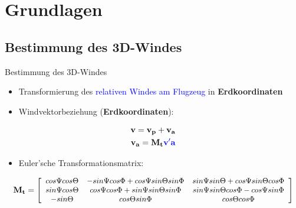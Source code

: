\documentclass[ucs,9pt]{beamer}
\begin{document}
\section{Grundlagen}

\subsection{Bestimmung des 3D-Windes}

\begin{frame}{Bestimmung des 3D-Windes}
	\begin{itemize}
		\item Transformierung des \textcolor{blue}{relativen Windes am Flugzeug} in \textbf{Erdkoordinaten}
		\item Windvektorbeziehung (\textbf{Erdkoordinaten}):
	\end{itemize}
	
	\begin{align}
		\mathbf{v} = \mathbf{v_p} + \mathbf{v_a} \\
		\mathbf{v_a} = \mathbf{M_t} \textcolor{blue}{\mathbf{v'a}} \\
	\end{align}
	\begin{itemize}
		\item Euler'sche Transformationsmatrix:
	\end{itemize}
	\begin{equation}\small
		\mathbf{M_t} = \left[\begin{array}{ccc}
		cos\Psi cos\Theta & -sin\Psi cos\Phi + cos\Psi sin\Theta sin\Phi & sin\Psi sin\Theta + cos\Psi sin\Theta cos\Phi \\
		sin\Psi cos\Theta & cos\Psi cos\Phi + sin\Psi sin\Theta sin\Phi & sin\Psi sin\Theta cos\Phi - cos\Psi sin\Phi \\
		-sin\Theta & cos\Theta sin\Phi & cos\Theta cos\Phi
		\end{array}\right]
	\end{equation}
\end{frame}
\end{document}
